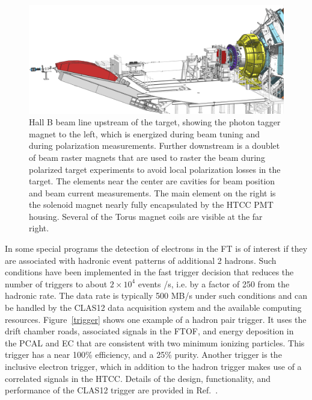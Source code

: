 \documentclass[final,3p,twocolumn]{elsarticle}
\begin{document}
\begin{figure}[htbp!]
\centerline{\includegraphics[width=2.0\columnwidth]{beamline-1.png}}
\caption{Hall B beam line upstream of the target, showing the photon tagger magnet to the left, which is energized during beam 
tuning and during polarization measurements. Further downstream is a doublet of beam raster magnets that are used 
to raster the beam during polarized target experiments to avoid local polarization losses in the target. The elements near the 
center are cavities for beam position and beam current measurements. The main element 
on the right is the solenoid magnet nearly fully encapsulated by the HTCC PMT housing. Several of the Torus 
magnet coils are visible at the far right.  }
\label{beamline-upstream}
\end{figure}

In some special programs the detection of electrons in the FT is of interest if they 
are associated with hadronic event patterns of additional 2 hadrons. Such conditions have been implemented in the 
fast trigger decision that reduces the number of triggers to about $2 \times 10^4$ events /s, i.e. by  a factor of 
250 from the hadronic rate. The data rate is typically 500 MB/s under such conditions and can be handled by 
the CLAS12 data acquisition system and the available computing resources. 
Figure~\ref{trigger} shows one example of a hadron pair trigger. It uses the drift chamber roads, associated signals in the FTOF, 
and energy deposition in the PCAL and EC that are consistent with two minimum ionizing particles. This trigger has 
 a near 100\% efficiency, and a 25\% purity. Another trigger is the inclusive electron trigger, which in addition to the hadron trigger 
 makes use of a correlated signals in the HTCC.  
Details of the design, functionality, and performance of the CLAS12 trigger are provided in  Ref.~\cite{DAQ}. 
  
\end{document}

